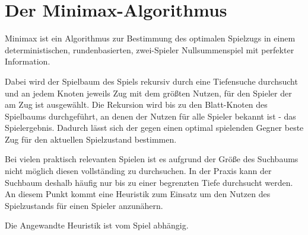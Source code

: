 \section{Der Minimax-Algorithmus}

Minimax ist ein Algorithmus zur Bestimmung des optimalen Spielzugs in einem deterministischen, rundenbasierten, zwei-Spieler Nullsummenspiel mit perfekter Information.

Dabei wird der Spielbaum des Spiels rekursiv durch eine Tiefensuche durchsucht und an jedem Knoten jeweils Zug mit dem größten Nutzen, für den Spieler der am Zug ist ausgewählt.
Die Rekursion wird bis zu den Blatt-Knoten des Spielbaums durchgeführt, an denen der Nutzen für alle Spieler bekannt ist - das Spielergebnis.
Dadurch lässt sich der gegen einen optimal spielenden Gegner beste Zug für den aktuellen Spielzustand bestimmen.

Bei vielen praktisch relevanten Spielen ist es aufgrund der Größe des Suchbaums nicht möglich diesen vollständing zu durchsuchen.
In der Praxis kann der Suchbaum deshalb häufig nur bis zu einer begrenzten Tiefe durchsucht werden. An diesem Punkt kommt eine Heuristik zum Einsatz um den Nutzen des Spielzustands für einen Spieler anzunähern.

Die Angewandte Heuristik ist vom Spiel abhängig.